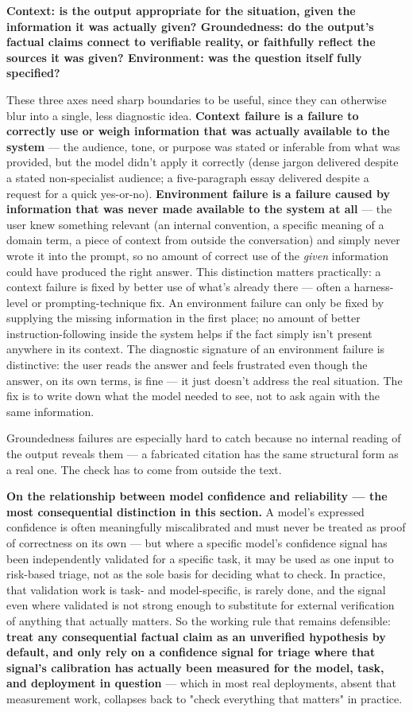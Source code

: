 \textbf{Context: is the output appropriate for the situation, given the information it was actually given? Groundedness: do the output's factual claims connect to verifiable reality, or faithfully reflect the sources it was given? Environment: was the question itself fully specified?}

These three axes need sharp boundaries to be useful, since they can otherwise blur into a single, less diagnostic idea. \textbf{Context failure is a failure to correctly use or weigh information that was actually available to the system} --- the audience, tone, or purpose was stated or inferable from what was provided, but the model didn't apply it correctly (dense jargon delivered despite a stated non-specialist audience; a five-paragraph essay delivered despite a request for a quick yes-or-no). \textbf{Environment failure is a failure caused by information that was never made available to the system at all} --- the user knew something relevant (an internal convention, a specific meaning of a domain term, a piece of context from outside the conversation) and simply never wrote it into the prompt, so no amount of correct use of the \emph{given} information could have produced the right answer. This distinction matters practically: a context failure is fixed by better use of what's already there --- often a harness-level or prompting-technique fix. An environment failure can only be fixed by supplying the missing information in the first place; no amount of better instruction-following inside the system helps if the fact simply isn't present anywhere in its context. The diagnostic signature of an environment failure is distinctive: the user reads the answer and feels frustrated even though the answer, on its own terms, is fine --- it just doesn't address the real situation. The fix is to write down what the model needed to see, not to ask again with the same information.

Groundedness failures are especially hard to catch because no internal reading of the output reveals them --- a fabricated citation has the same structural form as a real one. The check has to come from outside the text.

\textbf{On the relationship between model confidence and reliability --- the most consequential distinction in this section.} A model's expressed confidence is often meaningfully miscalibrated and must never be treated as proof of correctness on its own --- but where a specific model's confidence signal has been independently validated for a specific task, it may be used as one input to risk-based triage, not as the sole basis for deciding what to check. In practice, that validation work is task- and model-specific, is rarely done, and the signal even where validated is not strong enough to substitute for external verification of anything that actually matters. So the working rule that remains defensible: \textbf{treat any consequential factual claim as an unverified hypothesis by default, and only rely on a confidence signal for triage where that signal's calibration has actually been measured for the model, task, and deployment in question} --- which in most real deployments, absent that measurement work, collapses back to "check everything that matters" in practice.

